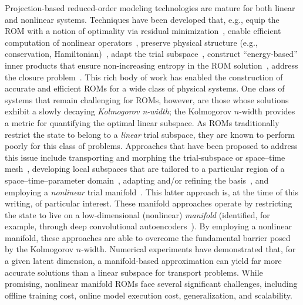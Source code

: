 \documentclass[3p,computermodern,10pt]{elsarticle}
\begin{document}
Projection-based reduced-order modeling technologies are mature for both linear and nonlinear systems. Techniques have been developed that, e.g., equip the ROM with a notion of optimality via residual minimization~\cite{carlberg_lspg,carlberg_gnat,legresley_1,legresley_2,legresley_3,bui_resmin_steady,bui_unsteady,rovas_thesis,carlberg_thesis,bui_thesis,l1, yano_thesis, choi_stlspg,constantine_strom,yuki_stlspg,parish_wls,townePOD}, enable efficient computation of nonlinear operators~\cite{eim,deim,everson_sirovich_gappy,carlberg_gnat,yano19}, preserve physical structure (e.g., conservation, Hamiltonian)~\cite{carlberg_conservative_rom,LALL2003304,carlberg2012spd,structurePreserveBeattie,chaturantabut2016structure,farhat2014dimensional}, adapt the trial subspace~\cite{ETTER2020112931,carlberg_hadaptation,adeim_peherstorfer}, construct ``energy-based'' inner
products that ensure non-increasing entropy in the ROM
solution~\cite{rowley_pod_energyproj,Kalashnikova_sand2014,chan2019entropy},
 address the closure problem~\cite{san_iliescu_geostrophic,iliescu_pod_eddyviscosity,iliescu_vms_pod_ns,Bergmann_pod_vms,iliescu_ciazzo_residual_rom,Wang_ROM_thesis,wentland_apg,Wang:269133,San2018}. This rich body of work has enabled the construction of accurate and efficient ROMs for a wide class of physical systems. One class of systems that remain challenging for ROMs, however, are those whose solutions exhibit a slowly decaying \textit{Kolmogorov n-width}; the Kolmogorov $n$-width provides a metric for quantifying the optimal linear subspace. As ROMs traditionally restrict the state to belong to a \textit{linear} trial subspace, they are known to perform poorly for this class of problems. Approaches that have been proposed to address this issue include transporting and morphing the trial-subspace or space--time mesh~\cite{nair_tsmor,mojgani2020physicsaware,mojgani2017lagrangian,}, developing local subspaces that are tailored to a particular region of a space--time--parameter domain~\cite{EfPaRo10,HaDiOh11,DiKaHa12,amsallem2012nonlinear,AmsZahWas15}, adapting and/or refining the basis~\cite{carlberg_hadaptation,adeim_peherstorfer}, and employing a \textit{nonlinear} trial manifold~\cite{LEE2020108973,kim2020fast}. This latter approach is, at the time of this writing, of particular interest. These manifold approaches operate by restricting the state to live on a low-dimensional (nonlinear) \textit{manifold} (identified, for example, through deep convolutional autoencoders~\cite{LeeCarlberg}). By employing a nonlinear manifold, these approaches are able to overcome the fundamental barrier posed by the Kolmogorov $n$-width. Numerical experiments have demonstrated that, for a given latent dimension, a manifold-based approximation can yield far more accurate solutions than a linear subspace for transport problems. While promising, nonlinear manifold ROMs face several significant challenges, including offline training cost, online model execution cost, generalization, and scalability. 
\end{document}
